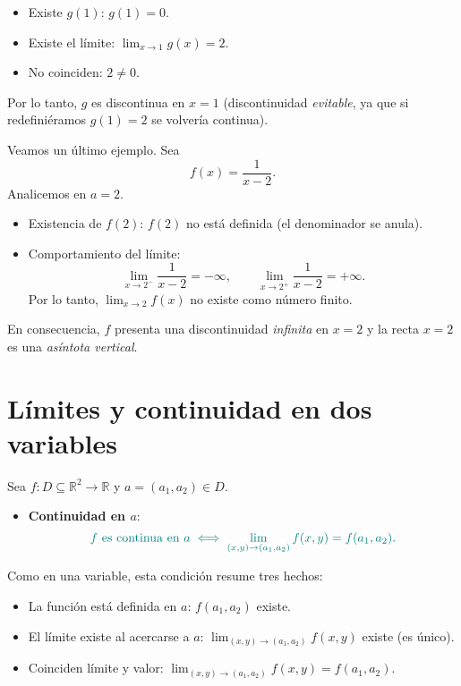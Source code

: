 \documentclass{article}
\begin{document}
\begin{itemize}
  \item {\color{teal}Existe \(g(1)\):} \(g(1)=0\).
  \item {\color{teal}Existe el límite:} \(\displaystyle \lim_{x\to1}g(x)=2\).
  \item {\color{teal}No coinciden:} \(2\neq 0\).
\end{itemize}

Por lo tanto, {\color{teal}\(g\) es discontinua en \(x=1\)} (discontinuidad \emph{evitable}, ya que si redefiniéramos \(g(1)=2\) se volvería continua).

Veamos un último ejemplo. Sea
\[
f(x)=\frac{1}{x-2}.
\]
Analicemos en \(a=2\).

\begin{itemize}
  \item {\color{teal}Existencia de \(f(2)\):} \(f(2)\) no está definida (el denominador se anula).
  \item {\color{teal}Comportamiento del límite:}
  \[
    \lim_{x\to 2^-}\frac{1}{x-2}=-\infty,
    \qquad
    \lim_{x\to 2^+}\frac{1}{x-2}=+\infty.
  \]
  Por lo tanto, \(\displaystyle \lim_{x\to 2}f(x)\) no existe como número finito.
\end{itemize}

En consecuencia, {\color{teal}\(f\) presenta una discontinuidad \emph{infinita} en \(x=2\)} y la recta \(x=2\) es una \emph{asíntota vertical}.


\section*{Límites y continuidad en dos variables}

Sea \(f\colon D\subseteq\mathbb{R}^2\to\mathbb{R}\) y \(a=(a_1,a_2)\in D\).

\begin{itemize}
  \item \textbf{{\color{teal}Continuidad en \(a\)}}:
  \[
    \color{teal}
    f \text{ es continua en } a
    \;\Longleftrightarrow\;
    \lim_{(x,y)\to(a_1,a_2)} f(x,y)=f(a_1,a_2).
  \]
\end{itemize}

Como en una variable, esta condición resume tres hechos:
\begin{itemize}
  \item {\color{teal}La función está definida en \(a\):} \(f(a_1,a_2)\) existe.
  \item {\color{teal}El límite existe al acercarse a \(a\):}
  \(\displaystyle \lim_{(x,y)\to(a_1,a_2)} f(x,y)\) existe (es único).
  \item {\color{teal}Coinciden límite y valor:}
  \(\displaystyle \lim_{(x,y)\to(a_1,a_2)} f(x,y)=f(a_1,a_2)\).
\end{itemize}
\end{document}
